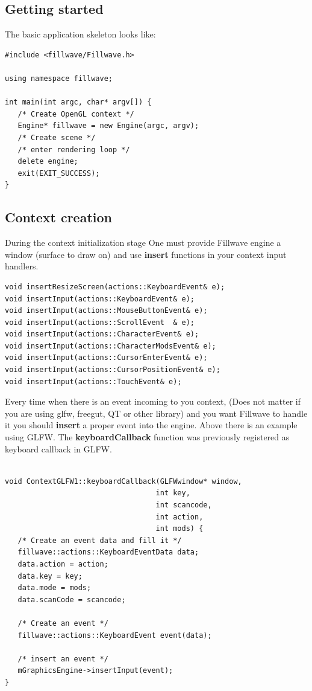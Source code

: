 \documentclass{article}
\begin{document}
\subsection{Getting started}\label{sec:Getting started}
\indent \indent The basic application skeleton looks like:

\begin{lstlisting}
#include <fillwave/Fillwave.h>

using namespace fillwave;

int main(int argc, char* argv[]) {
   /* Create OpenGL context */
   Engine* fillwave = new Engine(argc, argv);
   /* Create scene */
   /* enter rendering loop */
   delete engine;
   exit(EXIT_SUCCESS);
}
\end{lstlisting}

\subsection{Context creation}\label{sec:Context}
\indent \indent During the context initialization stage One must provide Fillwave engine a window (surface to draw on) and use \textbf{insert} functions in your context input handlers.

\begin{lstlisting}
void insertResizeScreen(actions::KeyboardEvent& e);
void insertInput(actions::KeyboardEvent& e);
void insertInput(actions::MouseButtonEvent& e);
void insertInput(actions::ScrollEvent  & e);
void insertInput(actions::CharacterEvent& e);
void insertInput(actions::CharacterModsEvent& e);
void insertInput(actions::CursorEnterEvent& e);
void insertInput(actions::CursorPositionEvent& e);
void insertInput(actions::TouchEvent& e);
\end{lstlisting}

\indent \indent Every time when there is an event incoming to you context, (Does not matter if you are using glfw, freegut, QT or other library) and you want Fillwave to handle it you should \textbf{insert} a proper event into the engine. Above there is an example using GLFW. The \textbf{keyboardCallback} function was previously registered as keyboard callback in GLFW.  

\begin{lstlisting}

void ContextGLFW1::keyboardCallback(GLFWwindow* window,
                                   int key,
                                   int scancode,
                                   int action,
                                   int mods) {
   /* Create an event data and fill it */
   fillwave::actions::KeyboardEventData data;
   data.action = action;
   data.key = key;
   data.mode = mods;
   data.scanCode = scancode;
   
   /* Create an event */
   fillwave::actions::KeyboardEvent event(data);
   
   /* insert an event */
   mGraphicsEngine->insertInput(event);
}
\end{lstlisting}
\end{document}

